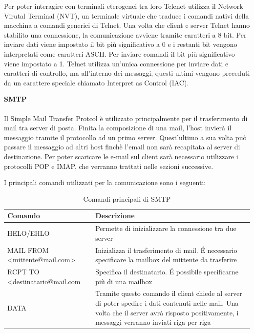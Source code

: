 \documentclass[12pt]{report}
\begin{document}
Per poter interagire con terminali eterogenei tra loro Telenet utilizza il Network Virutal Terminal (NVT), un terminale virtuale che traduce i comandi nativi della macchina a comandi generici di Telnet. Una volta che client e server Telnet hanno stabilito una connessione, la comunicazione avviene tramite caratteri a 8 bit. Per inviare dati viene impostato il bit più significativo a 0 e i restanti bit vengono interpretati come caratteri ASCII. Per inviare comandi il bit più significativo viene impostato a 1. Telnet utilizza un'unica connessione per inviare dati e caratteri di controllo, ma all'interno dei messaggi, questi ultimi vengono preceduti da un carattere speciale chiamato Interpret as Control (IAC).  

\noindent
\textbf{SMTP}
\\\\
Il Simple Mail Transfer Protcol è utilizzato principalmente per il trasferimento di mail tra server di posta. Finita la composizione di una mail, l'host invierà il messaggio tramite il protocollo ad un primo server. Quest'ultimo a sua volta può passare il messaggio ad altri host finchè l'email non sarà recapitata al server di destinazione. Per poter scaricare le e-mail sul client sarà necessario utilizzare i protocolli POP e IMAP, che verranno trattati nelle sezioni successive.\cite{rfcSMTP}

I principali comandi utilizzati per la comunicazione sono i seguenti:
\begin{table}[htbp]
\centering
\begin{tabular}{@{}m{7cm}m{7cm}@{}}
\toprule
\textbf{Comando} & \textbf{Descrizione} \\ \midrule
HELO/EHLO & Permette di inizializzare la connessione tra due server \\ \hline
MAIL FROM <mittente@mail.com> & Inizializza il trasferimento di mail. \'{E} necessario specificare la mailbox del mittente da trasferire \\ \hline
RCPT TO <destinatario@mail.com & Specifica il destinatario. \'{E} possibile specificarne più di una mailbox \\ \hline
DATA & Tramite questo comando il client chiede al server di poter spedire i dati contenuti nelle mail. Una volta che il server avrà risposto positivamente, i messaggi verranno inviati riga per riga \\ \bottomrule
\end{tabular}
\caption{Comandi principali di SMTP}
\label{tab:comandi_SMTP}
\end{table}
\end{document}

